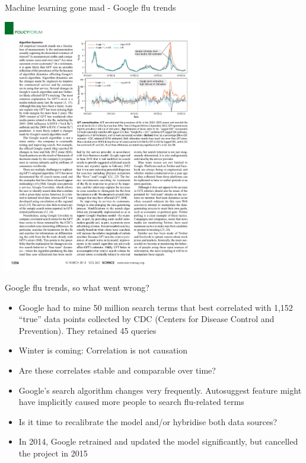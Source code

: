 \documentclass[pdf]{beamer}
\begin{document}
\begin{frame}{Machine learning gone mad - Google flu trends}
\begin{center}
		\includegraphics[width=0.65\textwidth]{googleFluTrend3.pdf}
\end{center}
\end{frame}

\begin{frame}{Google flu trends, so what went wrong?}
\begin{itemize}\addtolength{\itemsep}{.75\baselineskip}
	\item<1-> Google had to mine 50 million search terms that best correlated with 1,152 ``true'' data points 
	collected by CDC (Centers for Disease Control and Prevention). They retained 45 queries 
	\item<2-> Winter is coming: Correlation is not causation
	\item<3-> Are these correlates stable and comparable over time?
	\item<4-> Google's search algorithm changes very frequently. Autosuggest feature might have implicitly 
	caused more people to search flu-related terms 
	\item<5-> Is it time to recalibrate the model and/or hybridise both data sources?
	\item<6-> In 2014, Google retrained and updated the model significantly, but cancelled the project in 2015
\end{itemize}
\end{frame}
\end{document}
